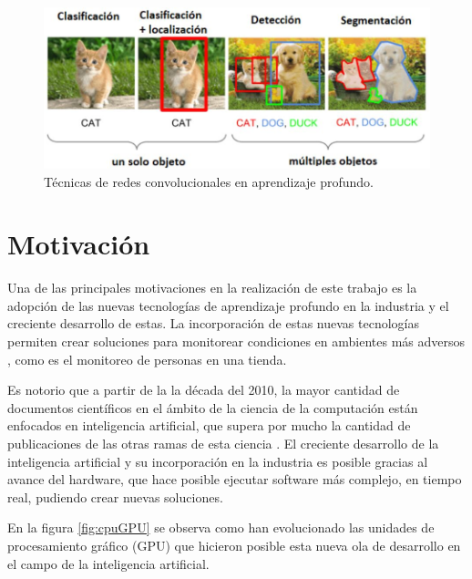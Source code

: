\begin{figure}[ht]
	\centering
	\includegraphics[scale=.7]{./Figures/visionDeepLearning.jpg}
	\caption{Técnicas de redes convolucionales en aprendizaje profundo.}
	\label{fig:visionDeepLearning}
\end{figure}


\section{Motivación}
\label{sec:motivacion}

Una de las principales motivaciones en la realización de este trabajo es la adopción de las nuevas tecnologías de aprendizaje profundo en la industria y el  creciente desarrollo de estas. La incorporación de estas nuevas tecnologías permiten crear soluciones para monitorear condiciones en ambientes más adversos , como es el monitoreo de personas en una tienda.

Es notorio que a partir de la la década del 2010, la mayor cantidad de documentos científicos en el ámbito de la ciencia de la computación están enfocados en inteligencia artificial, que supera por mucho la cantidad de publicaciones de las otras ramas de esta ciencia \citep{AI_PAPERS}. El creciente desarrollo de la inteligencia artificial y su incorporación en la industria es posible gracias al avance del hardware, que hace posible ejecutar software más complejo, en tiempo real, pudiendo crear nuevas soluciones.

\newpage

En la figura \ref{fig:cpuGPU} se observa como han evolucionado las unidades de procesamiento gráfico (GPU) que hicieron posible esta nueva ola de desarrollo en el campo de la inteligencia artificial.


